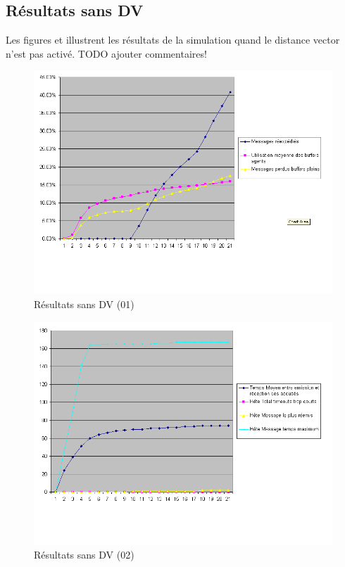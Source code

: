 \documentclass[a4paper,11pt]{article}
\begin{document}
\subsection{Résultats sans DV}
Les figures  et  illustrent les résultats de la simulation quand le distance vector n'est pas activé.
TODO ajouter commentaires!
\begin{figure}[h!t]
  \centering
    \includegraphics[scale=0.55]{sansdv1}
  \caption{Résultats sans DV (01)}
  \label{fig:sansdv01}
\end{figure}

\begin{figure}[h!t]
  \centering
    \includegraphics[scale=0.55]{sansdv2}
  \caption{Résultats sans DV (02)}
  \label{fig:sansdv02}
\end{figure}
\end{document}
